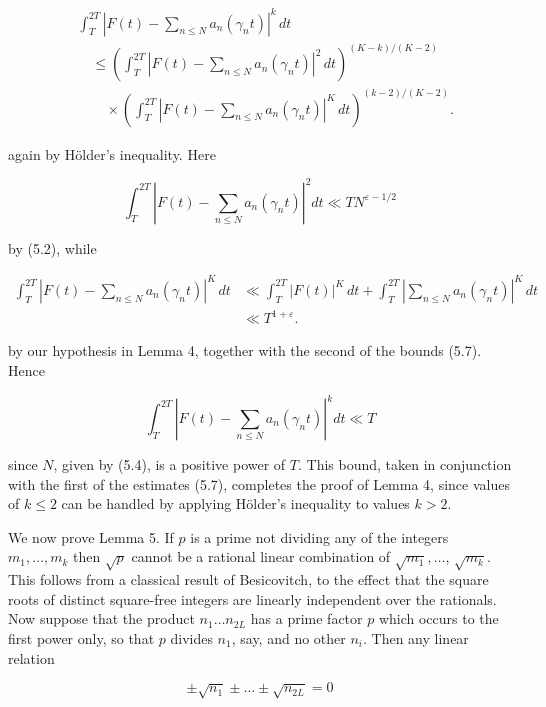 \documentclass[10pt]{article}
\begin{document}
$$
\begin{aligned}
&\int_{T}^{2T}\left|F(t)-\sum_{n \leq N}a_{n}\left(\gamma_{n}t\right)\right|^{k}\,dt \\
&\quad\leq\left(\int_{T}^{2T}\left|F(t)-\sum_{n \leq N}a_{n}\left(\gamma_{n}t\right)\right|^{2}\,dt\right)^{(K-k)/(K-2)} \\
&\qquad\times\left(\int_{T}^{2T}\left|F(t)-\sum_{n \leq N}a_{n}\left(\gamma_{n}t\right)\right|^{K}\,dt\right)^{(k-2)/(K-2)}.
\end{aligned}
$$

again by Hölder's inequality. Here

$$
\int_{T}^{2 T}\left|F(t)-\sum_{n \leq N} a_{n}\left(\gamma_{n} t\right)\right|^{2} d t \ll T N^{\varepsilon-1 / 2}
$$

by (5.2), while

$$
\begin{aligned}
\int_{T}^{2T}\left|F(t)-\sum_{n \leq N}a_{n}\left(\gamma_{n}t\right)\right|^{K}\,dt
&\ll \int_{T}^{2T}|F(t)|^{K}\,dt
 +\int_{T}^{2T}\left|\sum_{n \leq N}a_{n}\left(\gamma_{n}t\right)\right|^{K}\,dt \\
&\ll T^{1+\varepsilon}.
\end{aligned}
$$

by our hypothesis in Lemma 4, together with the second of the bounds (5.7). Hence

$$
\int_{T}^{2 T}\left|F(t)-\sum_{n \leq N} a_{n}\left(\gamma_{n} t\right)\right|^{k} d t \ll T
$$

since $N$, given by (5.4), is a positive power of $T$. This bound, taken in conjunction with the first of the estimates (5.7), completes the proof of Lemma 4, since values of $k \leq 2$ can be handled by applying Hölder's inequality to values $k>2$.

We now prove Lemma 5. If $p$ is a prime not dividing any of the integers $m_{1}, \ldots, m_{k}$ then $\sqrt{p}$ cannot be a rational linear combination of $\sqrt{m_{1}}, \ldots$, $\sqrt{m_{k}}$. This follows from a classical result of Besicovitch, to the effect that the square roots of distinct square-free integers are linearly independent over the rationals. Now suppose that the product $n_{1} \ldots n_{2 L}$ has a prime factor $p$ which occurs to the first power only, so that $p$ divides $n_{1}$, say, and no other $n_{i}$. Then any linear relation


\begin{equation*}
\pm \sqrt{n_{1}} \pm \ldots \pm \sqrt{n_{2 L}}=0 \tag{5.8}
\end{equation*}
\end{document}
